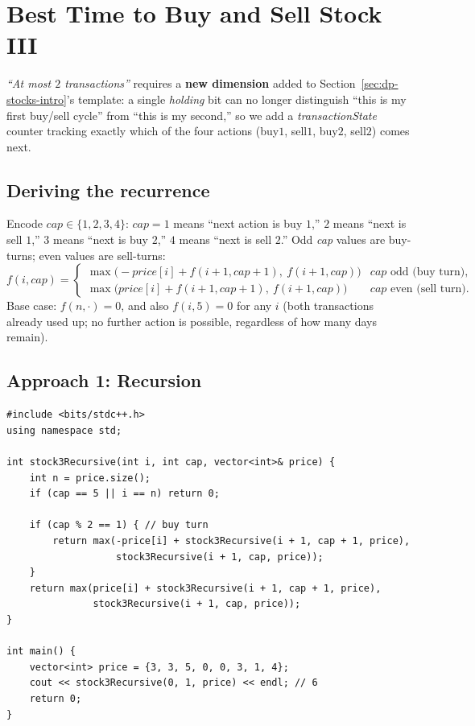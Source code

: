 \section{Best Time to Buy and Sell Stock III}
\label{sec:dp-stock-3}


\begin{patternbox}
\emph{``At most $2$ transactions''} requires a \textbf{new dimension}
added to Section~\ref{sec:dp-stocks-intro}'s template: a single
\textit{holding} bit can no longer distinguish ``this is my first
buy/sell cycle'' from ``this is my second,'' so we add a
\textit{transactionState} counter tracking exactly which of the four
actions (buy$1$, sell$1$, buy$2$, sell$2$) comes next.
\end{patternbox}

\subsection*{Deriving the recurrence}

Encode $\textit{cap} \in \{1,2,3,4\}$: $\textit{cap}=1$ means ``next
action is buy $1$,'' $2$ means ``next is sell $1$,'' $3$ means ``next is
buy $2$,'' $4$ means ``next is sell $2$.'' Odd \textit{cap} values are
buy-turns; even values are sell-turns:
\[
  f(i, \textit{cap}) =
  \begin{cases}
    \max\big(-\textit{price}[i] + f(i{+}1, \textit{cap}{+}1),\
    f(i{+}1, \textit{cap})\big) & \textit{cap} \text{ odd (buy turn)}, \\
    \max\big(\textit{price}[i] + f(i{+}1, \textit{cap}{+}1),\
    f(i{+}1, \textit{cap})\big) & \textit{cap} \text{ even (sell turn)}.
  \end{cases}
\]
Base case: $f(n, \cdot) = 0$, and also $f(i, 5) = 0$ for any $i$ (both
transactions already used up; no further action is possible, regardless
of how many days remain).

\subsection*{Approach 1: Recursion}

\begin{lstlisting}
#include <bits/stdc++.h>
using namespace std;

int stock3Recursive(int i, int cap, vector<int>& price) {
    int n = price.size();
    if (cap == 5 || i == n) return 0;

    if (cap % 2 == 1) { // buy turn
        return max(-price[i] + stock3Recursive(i + 1, cap + 1, price),
                   stock3Recursive(i + 1, cap, price));
    }
    return max(price[i] + stock3Recursive(i + 1, cap + 1, price),
               stock3Recursive(i + 1, cap, price));
}

int main() {
    vector<int> price = {3, 3, 5, 0, 0, 3, 1, 4};
    cout << stock3Recursive(0, 1, price) << endl; // 6
    return 0;
}
\end{lstlisting}

